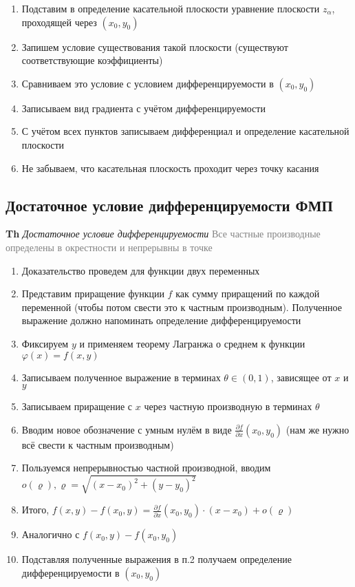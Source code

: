 \begin{enumerate}
    \item Подставим в определение касательной плоскости уравнение плоскости $z_\alpha$, проходящей через $(x_0, y_0)$
    \item Запишем условие существования такой плоскости (существуют соответствующие коэффициенты)
    \item Сравниваем это условие с условием дифференцируемости в $(x_0, y_0)$
    \item Записываем вид градиента с учётом дифференцируемости
    \item С учётом всех пунктов записываем дифференциал и определение касательной плоскости
    \item Не забываем, что касательная плоскость проходит через точку касания
\end{enumerate}

\subsection{Достаточное условие дифференцируемости ФМП}

\textbf{Th} \textit{Достаточное условие дифференцируемости}
\textcolor{gray}{Все частные производные определены в окрестности и непрерывны в точке}

\begin{enumerate}
    \item Доказательство проведем для функции двух переменных
    \item Представим приращение функции $f$ как сумму приращений по каждой переменной (чтобы потом свести это к
    частным производным).
    Полученное выражение должно напоминать определение дифференцируемости
    \item Фиксируем $y$ и применяем теорему Лагранжа о среднем к функции $\varphi (x) = f(x, y)$
    \item Записываем полученное выражение в терминах $\theta \in (0, 1)$, зависящее от $x$ и $y$
    \item Записываем приращение с $x$ через частную производную в терминах $\theta$
    \item Вводим новое обозначение с умным нулём в виде $\frac{\partial f}{\partial x} (x_0, y_0)$ (нам же нужно всё
    свести к частным производным)
    \item Пользуемся непрерывностью частной производной, вводим $o(\varrho), \varrho = \sqrt{(x - x_0)^2 + (y - y_0)^2}$
    \item Итого, $f(x, y) - f(x_0, y) =  \frac{\partial f}{\partial x} (x_0, y_0) \cdot (x - x_0) + o(\varrho)$
    \item Аналогично с $f(x_0, y) - f(x_0, y_0)$
    \item Подставляя полученные выражения в п.2 получаем определение дифференцируемости в $(x_0, y_0)$
\end{enumerate}

